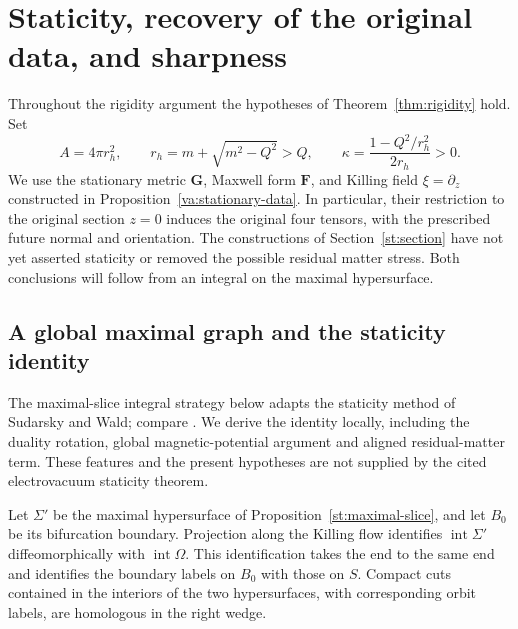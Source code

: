 \section{Staticity, recovery of the original data, and sharpness}
\label{ri:section}

Throughout the rigidity argument the hypotheses of
Theorem~\ref{thm:rigidity} hold.  Set
\[
 A=4\pi r_h^2,\qquad r_h=m+\sqrt{m^2-Q^2}>Q,
 \qquad \kappa=\frac{1-Q^2/r_h^2}{2r_h}>0.
\]
We use the stationary metric $\mathbf G$, Maxwell form $\mathbf F$,
and Killing field $\xi=\partial_z$ constructed in
Proposition~\ref{va:stationary-data}.  In particular, their restriction
to the original section $z=0$ induces the original four tensors,
with the prescribed future normal and orientation.  The constructions
of Section~\ref{st:section} have not yet asserted staticity or removed
the possible residual matter stress.  Both conclusions will follow
from an integral on the maximal hypersurface.

\subsection{A global maximal graph and the staticity identity}
\label{ri:staticity-subsection}

The maximal-slice integral strategy below adapts the staticity method of
Sudarsky and Wald; compare \cite[Eq.~(40) and Theorem~2]{SudarskyWald1993}.
We derive the identity locally, including the duality rotation, global
magnetic-potential argument and aligned residual-matter term.  These
features and the present hypotheses are not supplied by the cited
electrovacuum staticity theorem.

\begin{lemma}
\label{ri:orbit-graph}
Let $\Sigma'$ be the maximal hypersurface of
Proposition~\ref{st:maximal-slice}, and let $B_0$ be its bifurcation
boundary.  Projection along the Killing flow identifies
$\operatorname{int}\Sigma'$ diffeomorphically with
$\operatorname{int}\Omega$.  This identification takes the end to the
same end and identifies the boundary labels on $B_0$ with those on
$S$.  Compact cuts contained in the interiors of the two hypersurfaces,
with corresponding orbit labels, are homologous in the right wedge.
\end{lemma}

